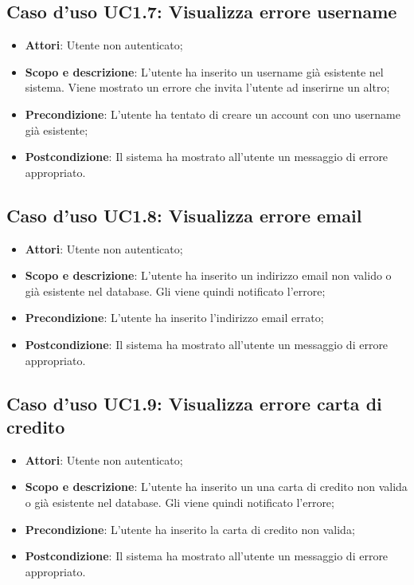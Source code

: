 \documentclass[12pt,a4paper,titlepage]{article}
\begin{document}
	\subsection{Caso d'uso UC1.7: Visualizza errore username}
	\label{UC1.7}
	\begin{itemize}
		\item \textbf{Attori}: Utente non autenticato;
		\item \textbf{Scopo e descrizione}: L'utente ha inserito un username già esistente nel sistema. Viene mostrato un errore che invita l'utente ad inserirne un altro;
		\item \textbf{Precondizione}: L'utente ha tentato di creare un account con uno username già esistente;
		\item \textbf{Postcondizione}: Il sistema ha mostrato all'utente un messaggio di errore appropriato.
	\end{itemize}
	\subsection{Caso d'uso UC1.8: Visualizza errore email}
	\label{UC1.8}
	\begin{itemize}
		\item \textbf{Attori}: Utente non autenticato;
		\item \textbf{Scopo e descrizione}: L'utente ha inserito un indirizzo email non valido o già esistente nel database. Gli viene quindi notificato l'errore;
		\item \textbf{Precondizione}: L'utente ha inserito l'indirizzo email errato;
		\item \textbf{Postcondizione}: Il sistema ha mostrato all'utente un messaggio di errore appropriato.
	\end{itemize}
	\subsection{Caso d'uso UC1.9: Visualizza errore carta di credito}
	\label{UC1.9}
	\begin{itemize}
		\item \textbf{Attori}: Utente non autenticato;
		\item \textbf{Scopo e descrizione}: L'utente ha inserito un una carta di credito non valida o già esistente nel database. Gli viene quindi notificato l'errore;
		\item \textbf{Precondizione}: L'utente ha inserito la carta di credito non valida;
		\item \textbf{Postcondizione}: Il sistema ha mostrato all'utente un messaggio di errore appropriato.
	\end{itemize}
\end{document}

